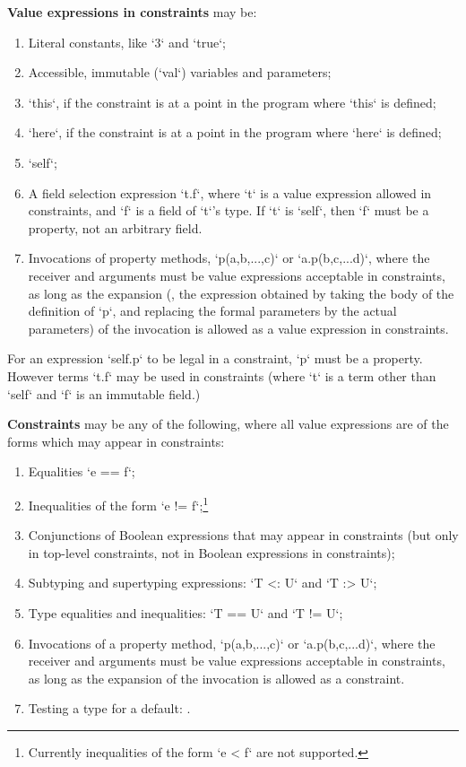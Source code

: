 {\bf Value expressions in constraints} may be: 
\begin{enumerate}
\item Literal constants, like \xcd`3` and \xcd`true`;
\item Accessible, immutable (\xcd`val`) variables and parameters;
\item \xcd`this`, if the constraint is at a point in the program where \xcd`this` is defined;
\item \xcd`here`, if the constraint is at a point in the program where \xcd`here` is defined;
\item \xcd`self`;
\item A field selection expression \xcd`t.f`, where \xcd`t` is a value
      expression allowed in constraints, and \xcd`f` is a field of \xcd`t`'s
      type.   If \xcd`t` is \xcd`self`, then \xcd`f` must be a property, not
      an arbitrary field.
 \item Invocations of property methods,  \xcd`p(a,b,...,c)` or
      \xcd`a.p(b,c,...d)`, where the receiver and arguments must be
       value expressions acceptable in constraints, as long as the expansion
       (\viz, the expression obtained by taking the body of the definition of
       \xcd`p`, and replacing the formal parameters by the actual parameters)
       of the invocation is allowed as a value expression in constraints.  
\end{enumerate}
For an expression \xcd`self.p` to be legal in a constraint, 
\xcd`p` must be 
a property. However terms \xcd`t.f` may be
used in constraints (where \xcd`t` is a term other than \xcd`self` and
\xcd`f` is an immutable field.)

{\bf Constraints}  may be any of
the following, where 
all value expressions are of the forms which may appear in constraints: 
\begin{enumerate}
\item Equalities \xcd`e == f`;
\item Inequalities of the form \xcd`e != f`;\footnote{Currently inequalities
      of the form \xcd`e < f` are not supported.}
\item Conjunctions of Boolean expressions that may appear in constraints (but
      only in top-level constraints, not in Boolean expressions in constraints);
\item Subtyping and supertyping expressions: \xcd`T <: U` and \xcd`T :> U`; 
\item Type equalities and inequalities: \xcd`T == U` and \xcd`T != U`; 
\item Invocations of a property method, \xcd`p(a,b,...,c)` or
      \xcd`a.p(b,c,...d)`, where the receiver and arguments must be value
      expressions acceptable in constraints, as long as the expansion of the
      invocation is allowed as a constraint.
\item Testing a type for a default: .
\end{enumerate}

